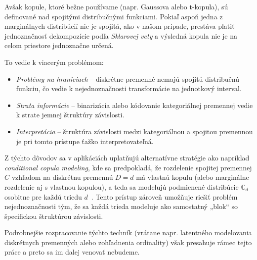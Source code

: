 Avšak kopule, ktoré bežne používame (napr. Gaussova alebo t-kopula), sú definované nad spojitými distribučnými funkciami. Pokiaľ aspoň jedna z marginálnych distribúcií nie je spojitá, ako v našom prípade, prestáva platiť jednoznačnosť dekompozície podľa \textit{Sklarovej vety} a výsledná kopula nie je na celom priestore jednoznačne určená.

To vedie k viacerým problémom:
\begin{itemize}
  \item \textit{Problémy na hraniciach} – diskrétne premenné nemajú spojitú distribučnú funkciu, čo vedie k nejednoznačnosti transformácie na jednotkový interval.
  \item \textit{Strata informácie} – binarizácia alebo kódovanie kategoriálnej premennej vedie k strate jemnej štruktúry závislosti.
  \item \textit{Interpretácia} – štruktúra závislosti medzi kategoriálnou a spojitou premennou je pri tomto prístupe ťažko interpretovateľná.
\end{itemize}

Z týchto dôvodov sa v aplikáciách uplatňujú alternatívne stratégie ako napríklad \textit{conditional copula modeling}, kde sa predpokladá, že rozdelenie spojitej premennej $C$ vzhľadom na diskrétnu premennú $D = d$ má vlastnú kopulu (alebo marginálne rozdelenie aj s vlastnou kopulou), a teda sa modelujú podmienené distribúcie $\mathbb{C}_d$ osobitne pre každú triedu $d$~\parencite{pleisMixtureDissertation}. Tento prístup zároveň umožňuje riešiť problém nejednoznačnosti tým, že sa každá trieda modeluje ako samostatný „blok“ so špecifickou štruktúrou závislosti.

Podrobnejšie rozpracovanie týchto techník (vrátane napr. latentného modelovania diskrétnych premenných alebo zohľadnenia ordinality) však presahuje rámec tejto práce a preto sa im ďalej venovať nebudeme.

